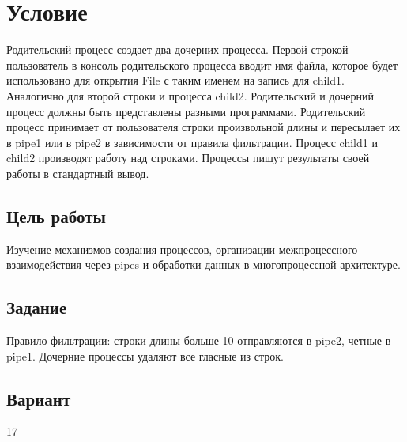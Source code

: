 \section{Условие}
        Родительский процесс создает два дочерних процесса. Первой строкой пользователь в консоль
родительского процесса вводит имя файла, которое будет использовано для открытия File с таким
именем на запись для child1. Аналогично для второй строки и процесса child2. Родительский 
и
дочерний процесс должны быть представлены разными программами. Родительский процесс принимает от пользователя строки произвольной длины и пересылает их в
pipe1 или в pipe2 в зависимости от правила фильтрации. Процесс child1 и child2 производят работу
над строками. Процессы пишут результаты своей работы в стандартный вывод. 

\subsection*{Цель работы}
        Изучение механизмов создания процессов, организации межпроцессного взаимодействия через pipes и обработки данных в многопроцессной архитектуре.

\subsection*{Задание}
    Правило фильтрации: строки длины больше 10 отправляются в pipe2, четные в pipe1.
    Дочерние процессы удаляют все гласные из строк.

\subsection*{Вариант}17